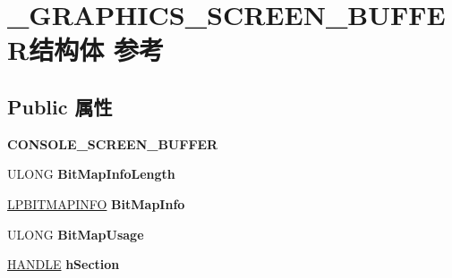 \hypertarget{struct___g_r_a_p_h_i_c_s___s_c_r_e_e_n___b_u_f_f_e_r}{}\section{\+\_\+\+G\+R\+A\+P\+H\+I\+C\+S\+\_\+\+S\+C\+R\+E\+E\+N\+\_\+\+B\+U\+F\+F\+E\+R结构体 参考}
\label{struct___g_r_a_p_h_i_c_s___s_c_r_e_e_n___b_u_f_f_e_r}
\subsection*{Public 属性}
\begin{DoxyCompactItemize}
\item 
\mbox{\label{struct___g_r_a_p_h_i_c_s___s_c_r_e_e_n___b_u_f_f_e_r_ae6651ae4935399147e2553308b7cd3f5}} 
{\bfseries C\+O\+N\+S\+O\+L\+E\+\_\+\+S\+C\+R\+E\+E\+N\+\_\+\+B\+U\+F\+F\+ER}
\item 
\mbox{\label{struct___g_r_a_p_h_i_c_s___s_c_r_e_e_n___b_u_f_f_e_r_a634e59355439f2ae8b47026c60d4c888}} 
U\+L\+O\+NG {\bfseries Bit\+Map\+Info\+Length}
\item 
\mbox{\label{struct___g_r_a_p_h_i_c_s___s_c_r_e_e_n___b_u_f_f_e_r_a70d1f76cf2eec10de9090453252ffe81}} 
\hyperlink{structtag_b_i_t_m_a_p_i_n_f_o}{L\+P\+B\+I\+T\+M\+A\+P\+I\+N\+FO} {\bfseries Bit\+Map\+Info}
\item 
\mbox{\label{struct___g_r_a_p_h_i_c_s___s_c_r_e_e_n___b_u_f_f_e_r_a4a987f1d59a0a8735765172a5656c8be}} 
U\+L\+O\+NG {\bfseries Bit\+Map\+Usage}
\item 
\mbox{\label{struct___g_r_a_p_h_i_c_s___s_c_r_e_e_n___b_u_f_f_e_r_ad37532108256e130281d71bc29f09c0d}} 
\hyperlink{interfacevoid}{H\+A\+N\+D\+LE} {\bfseries h\+Section}
\item 
\mbox{\label{struct___g_r_a_p_h_i_c_s___s_c_r_e_e_n___b_u_f_f_e_r_a6c54f4bb49c4f1013beb39f1d64fa53f}} 

\end{DoxyCompactItemize}
